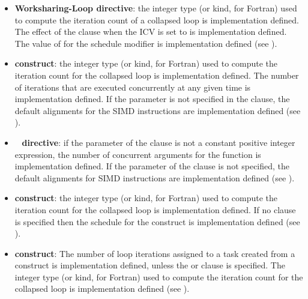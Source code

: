 \begin{itemize}
\item \textbf{Worksharing-Loop directive}: the integer type (or kind, for Fortran) used to compute the iteration
count of a collapsed loop is implementation defined. The effect of the
 clause when the  ICV is set to  is
implementation defined.
The value of  for the  schedule modifier is
implementation defined (see ).

\item {} \textbf{construct}: the integer type (or kind, for
  Fortran) used to compute the iteration count for the collapsed loop
  is implementation defined. The number of iterations that are
  executed concurrently at any given time is implementation
  defined. If the  parameter is not specified in the
   clause, the default alignments for the SIMD
  instructions are implementation defined (see ).

\item {}~ \textbf{directive}: if the parameter of the
   clause is not a constant positive integer expression,
  the number of concurrent arguments for the function is
  implementation defined. If the  parameter of the
   clause is not specified, the default alignments for
  SIMD instructions are implementation defined (see
  ).

\item {} \textbf{construct}: the integer type (or kind, for
    Fortran) used to compute the iteration count for the collapsed loop is
    implementation defined.  If no  clause is specified then the schedule for the 
construct is implementation defined (see ).

\item {} \textbf{construct}: The number of loop
  iterations assigned to a task created from a 
  construct is implementation defined, unless the  or
   clause is specified. The integer type (or kind,
  for Fortran) used to compute the iteration count for the collapsed
  loop is implementation defined (see ).



\end{itemize}
